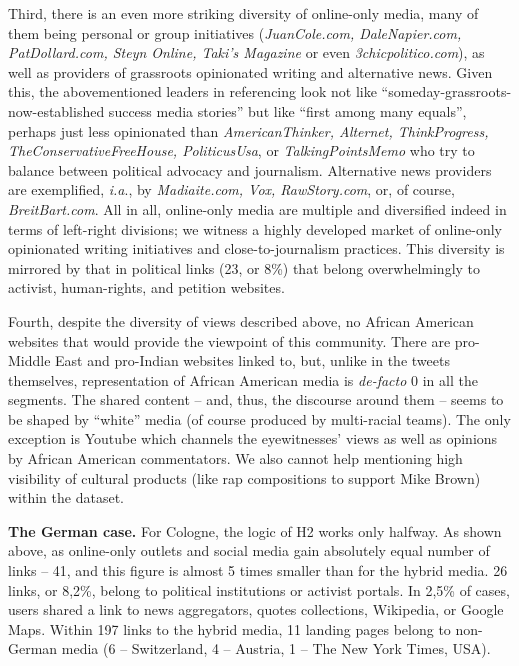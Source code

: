 Third, there is an even more striking diversity of online-only media, many of them being personal or group initiatives (\textit{JuanCole.com, DaleNapier.com, PatDollard.com, Steyn Online, Taki’s Magazine} or even \textit{3chicpolitico.com}), as well as providers of grassroots opinionated writing and alternative news. Given this, the abovementioned leaders in referencing look not like “someday-grassroots-now-established success media stories” but like “first among many equals”, perhaps just less opinionated than \textit{AmericanThinker, Alternet, ThinkProgress, TheConservativeFreeHouse, PoliticusUsa}, or \textit{TalkingPointsMemo} who try to balance between political advocacy and journalism. Alternative news providers are exemplified, \textit{i.a}., by \textit{Madiaite.com, Vox, RawStory.com}, or, of course, \textit{BreitBart.com}. All in all, online-only media are multiple and diversified indeed in terms of left-right divisions; we witness a highly developed market of online-only opinionated writing initiatives and close-to-journalism practices. This diversity is mirrored by that in political links (23, or 8\%) that belong overwhelmingly to activist, human-rights, and petition websites.

Fourth, despite the diversity of views described above, no African American websites that would provide the viewpoint of this community. There are pro-Middle East and pro-Indian websites linked to, but, unlike in the tweets themselves, representation of African American media is \textit{de-facto} 0 in all the segments. The shared content -- and, thus, the discourse around them -- seems to be shaped by “white” media (of course produced by multi-racial teams). The only exception is Youtube which channels the eyewitnesses’ views as well as opinions by African American commentators. We also cannot help mentioning high visibility of cultural products (like rap compositions to support Mike Brown) within the dataset.

\textbf{The German case.} For Cologne, the logic of H2 works only halfway. As shown above, as online-only outlets and social media gain absolutely equal number of links -- 41, and this figure is almost 5 times smaller than for the hybrid media. 26 links, or 8,2\%, belong to political institutions or activist portals. In 2,5\% of cases, users shared a link to news aggregators, quotes collections, Wikipedia, or Google Maps. Within 197 links to the hybrid media, 11 landing pages belong to non-German media (6 -- Switzerland, 4 -- Austria, 1 -- The New York Times, USA).

